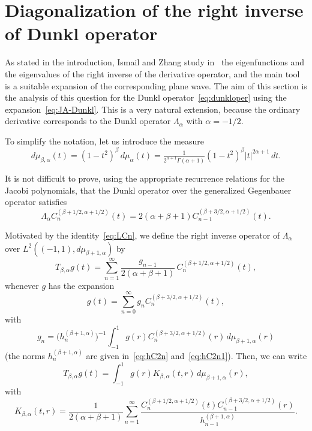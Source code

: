 \documentclass[12pt,a4paper]{amsart}
\theoremstyle{plain}
\theoremstyle{definition}
\begin{document}
\section{Diagonalization of the right inverse of Dunkl operator}
\label{sec:inverse}

As stated in the introduction, Ismail and Zhang study in~\cite{IZ} the
eigenfunctions and the eigenvalues of the right inverse of the derivative operator,
and the main tool is a suitable expansion of the corresponding plane wave.
The aim of this section is the analysis of this question for the
Dunkl operator~\eqref{eq:dunkloper} using the expansion~\eqref{eq:JA-Dunkl}.
This is a very natural extension, because the ordinary derivative
corresponds to the Dunkl operator $\Lambda_\alpha$ with $\alpha=-1/2$.

To simplify the notation, let us introduce the measure
\begin{equation*}
  d\mu_{\beta,\alpha}(t) = (1-t^2)^\beta \, d\mu_\alpha(t)
  = \tfrac{1}{2^{\alpha+1} \Gamma(\alpha+1)} (1-t^2)^\beta |t|^{2\alpha+1}\,dt.
\end{equation*}

It is not difficult to prove, using the appropriate recurrence
relations for the Jacobi polynomials, that the Dunkl operator over
the generalized Gegenbauer operator satisfies
\begin{equation}
\label{eq:LCn}
  \Lambda_\alpha C_n^{(\beta+1/2,\alpha+1/2)} (t)
  = 2(\alpha+\beta+1) C_{n-1}^{(\beta+3/2,\alpha+1/2)} (t).
\end{equation}

Motivated by the identity~\eqref{eq:LCn}, we define the right
inverse operator of $\Lambda_\alpha$ over $L^2((-1,1),
d\mu_{\beta+1,\alpha})$ by
\begin{equation*}
  T_{\beta,\alpha} g(t) = \sum_{n=1}^{\infty}
  \frac{g_{n-1}}{2(\alpha+\beta+1)} \, C_n^{(\beta+1/2,\alpha+1/2)}(t),
\end{equation*}
whenever $g$ has the expansion
\begin{equation*}
  g(t) = \sum_{n=0}^{\infty} g_n C_n^{(\beta+3/2,\alpha+1/2)} (t),
\end{equation*}
with
\begin{equation*}
  g_n = \big( h_n^{(\beta+1,\alpha)} \big)^{-1} \int_{-1}^1 g(r)
  C_n^{(\beta+3/2,\alpha+1/2)} (r) \,d\mu_{\beta+1,\alpha}(r)
\end{equation*}
(the norms $h_n^{(\beta+1,\alpha)}$ are given in~\eqref{eq:hC2n} and~\eqref{eq:hC2n1}).
Then, we can write
\begin{equation*}
  T_{\beta,\alpha} g(t) = \int_{-1}^1 g(r) K_{\beta,\alpha}(t,r) \,
  d\mu_{\beta+1,\alpha}(r),
\end{equation*}
with
\begin{equation*}
  K_{\beta,\alpha}(t,r)
  = \frac{1}{2(\alpha+\beta+1)}\sum_{n=1}^{\infty}
  \frac{C_n^{(\beta+1/2,\alpha+1/2)}(t) C_{n-1}^{(\beta+3/2,\alpha+1/2)}(r)}
    {h_{n-1}^{(\beta+1,\alpha)}}.
\end{equation*}
\end{document}
